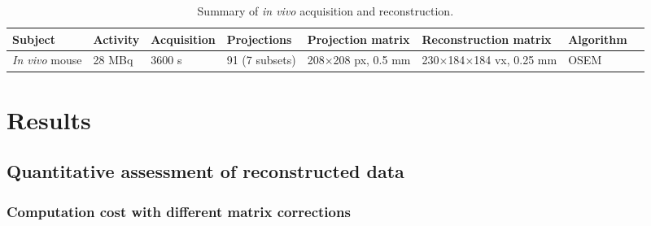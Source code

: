 \documentclass[utf8]{FrontiersinVancouver}
\begin{document}
\begin{table}[ht!]
\caption{Summary of \textit{in vivo} acquisition and reconstruction.\label{tab:invivo_summary}}
\footnotesize
\begin{tabular}{l l l l l l l l}
	\hline
	Subject & Activity & Acquisition & Projections & Projection matrix & Reconstruction matrix & Algorithm\\ \hline
	
	\textit{In vivo} mouse & 28 MBq & 3600 s & 91 (7 subsets) & 208$\times$208 px, 0.5 mm & 230$\times$184$\times$184 vx, 0.25 mm & OSEM	\\ \hline
\end{tabular}
\end{table}

\section{Results}



\subsection{Quantitative assessment of reconstructed data}

\subsubsection{Computation cost with different matrix corrections}
\end{document}
